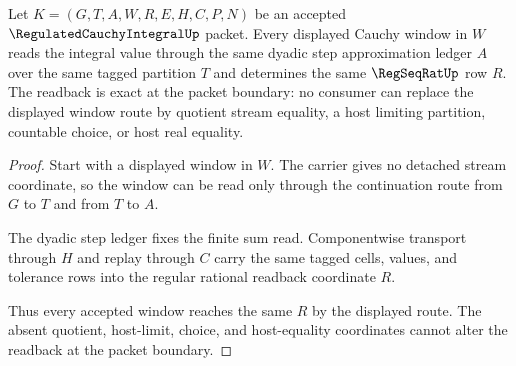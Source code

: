 \begin{theorem}
\label{thm:regulated-cauchy-integral-window-readback-exactness}
Let $K=(G,T,A,W,R,E,H,C,P,N)$ be an accepted $\RegulatedCauchyIntegralUp$ packet. Every displayed Cauchy window in $W$ reads the integral value through the same dyadic step approximation ledger $A$ over the same tagged partition $T$ and determines the same $\RegSeqRatUp$ row $R$. The readback is exact at the packet boundary: no consumer can replace the displayed window route by quotient stream equality, a host limiting partition, countable choice, or host real equality.
\end{theorem}
\begin{proof}
Start with a displayed window in $W$. The carrier gives no detached stream coordinate, so the window can be read only through the continuation route from $G$ to $T$ and from $T$ to $A$.

The dyadic step ledger fixes the finite sum read. Componentwise transport through $H$ and replay through $C$ carry the same tagged cells, values, and tolerance rows into the regular rational readback coordinate $R$.

Thus every accepted window reaches the same $R$ by the displayed route. The absent quotient, host-limit, choice, and host-equality coordinates cannot alter the readback at the packet boundary.
\end{proof}

